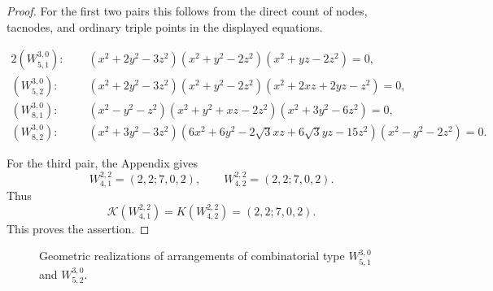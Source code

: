 \documentclass[11pt]{article}
\theoremstyle{plain}
\theoremstyle{definition}
\begin{document}
\begin{proof}
For the first two pairs this follows from the direct count of nodes, tacnodes, and ordinary triple points in the displayed equations.

        \begin{alignat*}{2}
        \left(W^{3,0}_{5,1}\right)\!:\;&\quad (x^2+2y^2-3z^2)(x^2+y^2-2z^2)(x^2+yz-2z^2)=0, \\
\left(W^{3,0}_{5,2}\right)\!:\;&\quad (x^2+2y^2-3z^2)(x^2+y^2-2z^2)(x^2+2xz+2yz-z^2)=0, \\
\left(W^{3,0}_{8,1}\right)\!:\;&\quad (x^2-y^2-z^2)(x^2+y^2+xz-2z^2)(x^2+3y^2-6z^2)=0,\\
\left(W^{3,0}_{8,2}\right)\!:\;&\quad (x^2+3y^2-3z^2)(6x^2+6y^2-2\sqrt{3}xz+6\sqrt{3}yz-15z^2)(x^2-y^2-2z^2)=0.
\end{alignat*}

\noindent
For the third pair, the Appendix gives
\[
W^{2,2}_{4,1}=(2,2;7,0,2),
\qquad
W^{2,2}_{4,2}=(2,2;7,0,2).
\]
Thus
\[
\mathcal{K}\left(W^{2,2}_{4,1}\right)=K\left(W^{2,2}_{4,2}\right)=(2,2;7,0,2).
\]
This proves the assertion.
\end{proof}


\begin{figure}[h!]
\begin{minipage}[t]{0.5\textwidth}
\centering
{}
\end{minipage}
\begin{minipage}[t]{0.5\textwidth}
\centering
{}
\end{minipage}
\caption{Geometric realizations of arrangements of combinatorial type $W^{3,0}_{5,1}$ and $W^{3,0}_{5,2}$.}
\end{figure}
\end{document}
